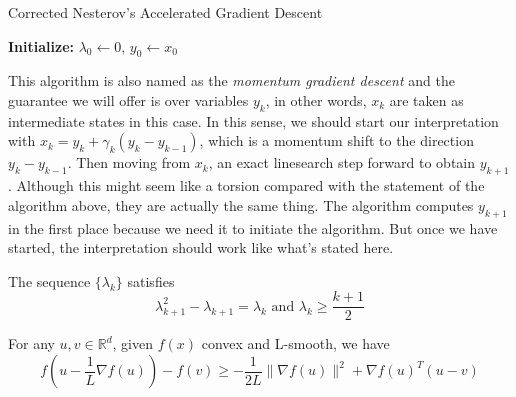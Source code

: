 \begin{minipage}{0.8\textwidth}  %
    \centering
    \begin{algorithm}[H]
        \caption{Corrected Nesterov's Accelerated Gradient Descent}\label{algo:NesterovAcceleratedGD}
    
        \textbf{Initialize:} $\lambda_0 \gets 0$, $y_0 \gets x_0$\;
    
    \end{algorithm}
    \vspace{2em}
\end{minipage}

\par

This algorithm is also named as the \emph{momentum gradient descent} and the guarantee we will offer is over variables $y_k$, in other words, $x_k$ are taken as intermediate states in this case. In this sense, we should start our interpretation with $x_{k} = y_{k} + \gamma_k (y_{k} - y_{k-1})$, which is a momentum shift to the direction $y_{k} - y_{k-1}$. Then moving from $x_{k}$, an exact linesearch step forward to obtain $y_{k+1}$. Although this might seem like a torsion compared with the statement of the algorithm above, they are actually the same thing. The algorithm computes $y_{k+1}$ in the first place because we need it to initiate the algorithm. But once we have started, the interpretation should work like what's stated here. 

\begin{lemma}
    The sequence $\{\lambda_k\}$ satisfies
    \begin{equation*}
        \lambda_{k+1}^2 - \lambda_{k+1} = \lambda_k \text{ and } \lambda_k \geq \frac{k+1}{2}
    \end{equation*}
\end{lemma}

\begin{lemma}
    For any $u, v \in \mathbb{R}^d$, given $f(x)$ convex and L-smooth, we have 
    \begin{equation*}
        f(u - \frac{1}{L}\nabla f(u)) - f(v) \geq - \frac{1}{2L} \| \nabla f(u) \|^2 + \nabla f(u)^T(u-v)
    \end{equation*}
\end{lemma}

